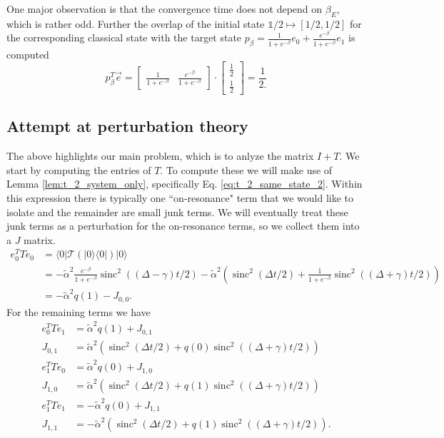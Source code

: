 \documentclass{article}
\newcommand{\ket}[1]{|#1\rangle}
\newcommand{\bra}[1]{\langle #1|}
\newcommand{\ketbra}[2]{| #1\rangle\! \langle #2|}
\newcommand{\identity}{\mathds{1}}
\DeclareMathOperator{\sinc}{sinc}
\begin{document}
One major observation is that the convergence time does not depend on $\beta_E$, which is rather odd. Further the overlap of the initial state $\identity / 2 \mapsto [1/2, 1/2]$ for the corresponding classical state with the target state $p_{\beta} = \frac{1}{1 + e^{-\beta}} e_0 + \frac{e^{-\beta}}{1 + e^{-\beta}} e_1$ is computed $$p_{\beta}^T \vec{e} = \begin{bmatrix}
    \frac{1}{1 + e^{-\beta}} & \frac{e^{-\beta}}{1 + e^{-\beta}}
\end{bmatrix} \cdot \begin{bmatrix}
    \frac{1}{2} \\ \frac{1}{2} \end{bmatrix} = \frac{1}{2.}$$

\subsection{Attempt at perturbation theory}

The above highlights our main problem, which is to anlyze the matrix $I + T$. We start by computing the entries of $T$. To compute these we will make use of Lemma \ref{lem:t_2_system_only}, specifically Eq. \eqref{eq:t_2_same_state_2}. Within this expression there is typically one ``on-resonance" term that we would like to isolate and the remainder are small junk terms. We will eventually treat these junk terms as a perturbation for the on-resonance terms, so we collect them into a $J$ matrix.
\begin{align}
    e_0^T T e_0 &= \bra{0} \mathcal{T}(\ketbra{0}{0}) \ket{0} \\
    &= - \widetilde{\alpha}^2 \frac{e^{-\beta}}{1 + e^{-\beta}}\sinc^2((\Delta - \gamma)t/2) - \widetilde{\alpha}^2 \left(\sinc^2(\Delta t/ 2) +  \frac{1}{1 + e^{-\beta}}\sinc^2((\Delta + \gamma)t/2) \right) \\
    &= -\widetilde{\alpha}^2 q(1) - J_{0,0}.
\end{align}
For the remaining terms we have
\begin{align}
    e_0^T T e_1 &=  \widetilde{\alpha}^2 q(1) + J_{0,1} \\
    J_{0,1} &= \widetilde{\alpha}^2 (\sinc^2(\Delta t/2) + q(0) \sinc^2((\Delta + \gamma)t/2)) \\
    e_1^T T e_0 &= \widetilde{\alpha}^2 q(0) + J_{1, 0} \\
    J_{1, 0} &= \widetilde{\alpha}^2 (\sinc^2(\Delta t / 2) + q(1) \sinc^2((\Delta + \gamma)t/2)) \\
    e_1^T T e_1 &= - \widetilde{\alpha}^2 q(0) + J_{1, 1} \\
    J_{1,1} &= -\widetilde{\alpha}^2 (\sinc^2(\Delta t/ 2) + q(1) \sinc^2((\Delta + \gamma)t/2)).
\end{align}
\end{document}
